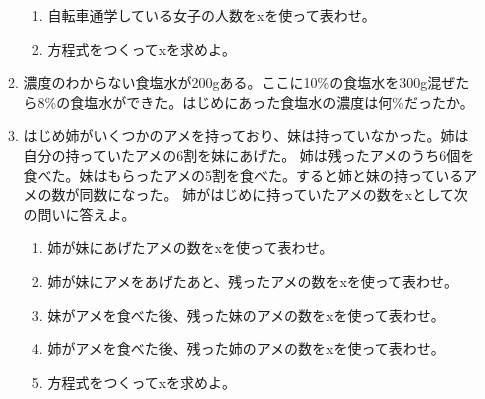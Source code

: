 \documentclass[a4paper,fleqn,papersize,15pt]{jsarticle}
\begin{document}
\begin{itemize}
\begin{enumerate}
\begin{enumerate}
\item 自転車通学している女子の人数をxを使って表わせ。 \vfill \begin{flushright}\framebox[8em]{\rule{0pt}{6ex}}\end{flushright} %
\item 方程式をつくってxを求めよ。 \vfill \begin{flushright}\framebox[8em]{\rule{0pt}{6ex}}\end{flushright} %
\end{enumerate}
\item 濃度のわからない食塩水が200gある。ここに10\%の食塩水を300g混ぜたら8\%の食塩水ができた。はじめにあった食塩水の濃度は何\%だったか。 \vfill \begin{flushright}\framebox[8em]{\rule{0pt}{6ex}}\end{flushright} %
\item はじめ姉がいくつかのアメを持っており、妹は持っていなかった。姉は自分の持っていたアメの6割を妹にあげた。 姉は残ったアメのうち6個を食べた。妹はもらったアメの5割を食べた。すると姉と妹の持っているアメの数が同数になった。 姉がはじめに持っていたアメの数をxとして次の問いに答えよ。 \vfill \begin{flushright}\framebox[8em]{\rule{0pt}{6ex}}\end{flushright} %
\begin{enumerate}
\item 姉が妹にあげたアメの数をxを使って表わせ。 \vfill \begin{flushright}\framebox[8em]{\rule{0pt}{6ex}}\end{flushright} %
\item 姉が妹にアメをあげたあと、残ったアメの数をxを使って表わせ。 \vfill \begin{flushright}\framebox[8em]{\rule{0pt}{6ex}}\end{flushright} %
\item 妹がアメを食べた後、残った妹のアメの数をxを使って表わせ。 \vfill \begin{flushright}\framebox[8em]{\rule{0pt}{6ex}}\end{flushright} %
\item 姉がアメを食べた後、残った姉のアメの数をxを使って表わせ。 \vfill \begin{flushright}\framebox[8em]{\rule{0pt}{6ex}}\end{flushright} %
\item 方程式をつくってxを求めよ。 \vfill \begin{flushright}\framebox[8em]{\rule{0pt}{6ex}}\end{flushright} %
\end{enumerate}
\end{enumerate}
    \vfill
\end{itemize}
\clearpage
\end{document}
